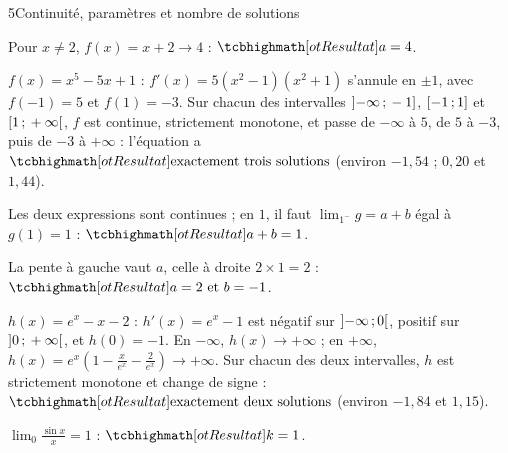 \begin{corrige}{5}{Continuité, paramètres et nombre de solutions}
\begin{questions}
  \item Pour $x\neq2$, $f(x)=x+2\to4$ : $\res{a=4}$.
  \item $f(x)=x^{5}-5x+1$ : $f'(x)=5\left(x^{2}-1\right)\left(x^{2}+1\right)$ s'annule en $\pm1$, avec $f(-1)=5$ et $f(1)=-3$.
    Sur chacun des intervalles $\mathopen{]}-\infty\,{;}\,-1\mathclose{]}$, $\mathopen{[}-1\,{;}\,1\mathclose{]}$ et $\mathopen{[}1\,{;}\,+\infty\mathclose{[}$, $f$ est continue, strictement
    monotone, et passe de $-\infty$ à $5$, de $5$ à $-3$, puis de $-3$ à $+\infty$ : l'équation a $\res{\text{exactement trois solutions}}$
    (environ $-1{,}54$ ; $0{,}20$ et $1{,}44$).
  \item \begin{questions}
      \item Les deux expressions sont continues ; en $1$, il faut $\lim_{1^{-}}g=a+b$ égal à $g(1)=1$ : $\res{a+b=1}$.
      \item La pente à gauche vaut $a$, celle à droite $2\times1=2$ : $\res{a=2\text{ et }b=-1}$.
    \end{questions}
  \item $h(x)=e^{x}-x-2$ : $h'(x)=e^{x}-1$ est négatif sur $\mathopen{]}-\infty\,{;}\,0\mathclose{[}$, positif sur $\mathopen{]}0\,{;}\,+\infty\mathclose{[}$, et
    $h(0)=-1$. En $-\infty$, $h(x)\to+\infty$ ; en $+\infty$, $h(x)=e^{x}\left(1-\frac{x}{e^{x}}-\frac{2}{e^{x}}\right)\to+\infty$.
    Sur chacun des deux intervalles, $h$ est strictement monotone et change de signe : $\res{\text{exactement deux solutions}}$
    (environ $-1{,}84$ et $1{,}15$).
  \item $\lim_{0}\frac{\sin x}{x}=1$ : $\res{k=1}$.
\end{questions}
\end{corrige}

